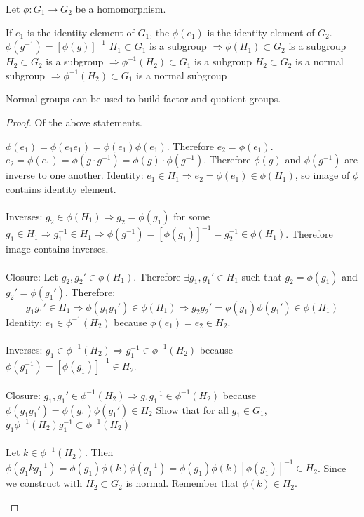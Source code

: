 \documentclass[class=scrartcl, crop=false]{standalone}
\begin{document}
\begin{theorem}
  Let $\phi:G_1 \to G_2$ be a homomorphism.
  \begin{enumerate}
    \ii
    If $e_1$ is the identity element of $G_1$, the $\phi(e_1)$ is the identity element of $G_2$.
    \ii
    $\phi(g^{-1}) = [\phi(g)]^{-1}$ 
    \ii
    $H_1 \subset G_1$ is a subgroup $\Rightarrow \phi(H_1) \subset G_2$ is a subgroup
    \ii
    $H_2 \subset G_2$ is a subgroup $\Rightarrow \phi^{-1}(H_2)\subset G_1$ is a subgroup
    \ii
    $H_2 \subset G_2$ is a normal subgroup $\Rightarrow \phi^{-1}(H_2)\subset G_1$ is a normal subgroup
  \end{enumerate}
  \begin{note}
    Normal groups can be used to build factor and quotient groups.
  \end{note}
  \begin{proof}
    Of the above statements.
    \begin{enumerate}
      \ii
      $\phi(e_1) = \phi(e_1e_1) = \phi(e_1)\phi(e_1)$. Therefore $e_2 = \phi(e_1)$.
      \ii
      $e_2 = \phi(e_1) = \phi(g\cdot g^{-1}) = \phi(g) \cdot \phi(g^{-1})$. Therefore $\phi(g)$ and $\phi(g^{-1})$ are inverse to one another.
      \ii
      Identity: $e_1 \in H_1 \Rightarrow e_2 = \phi(e_1) \in \phi(H_1)$, so image of $\phi$ contains identity element.
      \\\\
      Inverses: $g_2 \in \phi(H_1) \Rightarrow g_2 = \phi(g_1)$ for some $g_1 \in H_1 \Rightarrow g_1^{-1} \in H_1 \Rightarrow \phi(g^{-1}) = [\phi(g_1)]^{-1} = g_2^{-1} \in \phi(H_1)$. Therefore  image contains inverses.
      \\\\
      Closure: Let $g_2, g_2' \in \phi(H_1)$. Therefore $\exists g_1, g_1' \in H_1$ such that $g_2 = \phi(g_1)$ and $g_2' = \phi(g_1')$. Therefore:
      \[
        g_1g_1' \in H_1 \Rightarrow \phi(g_1g_1') \in \phi(H_1) \Rightarrow g_2g_2'=\phi(g_1)\phi(g_1') \in \phi(H_1)
      \]
      \ii
      Identity: $e_1 \in \phi^{-1}(H_2)$ because $\phi(e_1) = e_2 \in H_2$.
      \\\\
      Inverses: $g_1 \in \phi^{-1}(H_2) \Rightarrow g_1^{-1} \in \phi^{-1}(H_2)$ because $\phi(g_1^{-1}) = [\phi(g_1)]^{-1} \in H_2$.
      \\\\
      Closure: $g_1,g_1' \in \phi^{-1}(H_2) \Rightarrow g_1g_1^{-1} \in \phi^{-1}(H_2)$ because $\phi(g_1g_1') = \phi(g_1)\phi(g_1') \in H_2$
      \ii
      Show that for all $g_1 \in G_1$, $g_1\phi^{-1}(H_2)g_1^{-1} \subset \phi^{-1}(H_2)$ 
      \\\\
      Let $k \in \phi^{-1}(H_2)$. Then $\phi(g_1kg_1^{-1}) = \phi(g_1)\phi(k)\phi(g_1^{-1}) = \phi(g_1)\phi(k)[\phi(g_1)]^{-1} \in H_2$. Since we construct with $H_2 \subset G_2$ is normal. Remember that $\phi(k) \in H_2$.
    \end{enumerate}
  \end{proof}
\end{theorem}
\end{document}
